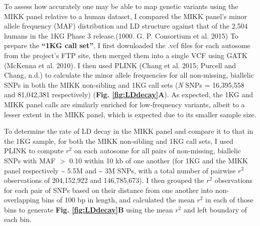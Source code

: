 \documentclass[
]{book}
\begin{document}
To assess how accurately one may be able to map genetic variants using the MIKK panel relative to a human dataset, I compared the MIKK panel's minor allele frequency (MAF) distribution and LD structure against that of the 2,504 humans in the 1KG Phase 3 release.(1000. G. P. Consortium et al. 2015) To prepare the \textbf{``1KG call set''}, I first downloaded the .vcf files for each autosome from the project's FTP site, then merged them into a single VCF using GATK (McKenna et al. 2010). I then used PLINK (Chang et al. 2015; Purcell and Chang, n.d.) to calculate the minor allele frequencies for all non-missing, biallelic SNPs in both the MIKK non-sibling and 1KG call sets (\emph{N} SNPs = 16,395,558 and 81,042,381 respectively) (\textbf{Fig. \ref{fig:LDdecay}A}). As expected, the 1KG and MIKK panel calls are similarly enriched for low-frequency variants, albeit to a lesser extent in the MIKK panel, which is expected due to its smaller sample size.

To determine the rate of LD decay in the MIKK panel and compare it to that in the 1KG sample, for both the MIKK non-sibling and 1KG call sets, I used PLINK to compute \(r^2\) on each autosome for all pairs of non-missing, biallelic SNPs with MAF \(>\) 0.10 within 10 kb of one another (for 1KG and the MIKK panel respectively \textasciitilde{} 5.5M and \textasciitilde{} 3M SNPs, with a total number of pairwise \(r^2\) observations of 204,152,922 and 146,785,673). I then grouped the \(r^2\) observations for each pair of SNPs based on their distance from one another into non-overlapping bins of 100 bp in length, and calculated the mean \(r^2\) in each of those bins to generate \textbf{Fig. \ref{fig:LDdecay}B} using the mean \(r^2\) and left boundary of each bin.
\end{document}
